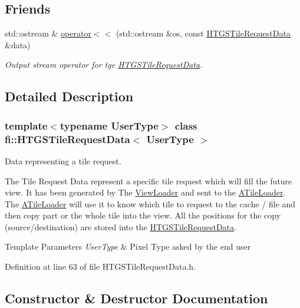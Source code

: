 \subsection*{Friends}
\begin{DoxyCompactItemize}
\item 
std\+::ostream \& \hyperlink{classfi_1_1HTGSTileRequestData_a5fc084a54b46bdd6bf5588119505e047}{operator$<$$<$} (std\+::ostream \&os, const \hyperlink{classfi_1_1HTGSTileRequestData}{H\+T\+G\+S\+Tile\+Request\+Data} \&data)
\begin{DoxyCompactList}\small\item\em Output stream operator for tge \hyperlink{classfi_1_1HTGSTileRequestData}{H\+T\+G\+S\+Tile\+Request\+Data}. \end{DoxyCompactList}\end{DoxyCompactItemize}


\subsection{Detailed Description}
\subsubsection*{template$<$typename User\+Type$>$\newline
class fi\+::\+H\+T\+G\+S\+Tile\+Request\+Data$<$ User\+Type $>$}

Data representing a tile request. 

The Tile Request Data represent a specific tile request which will fill the future view. It has been generated by The \hyperlink{classfi_1_1ViewLoader}{View\+Loader} and sent to the \hyperlink{classfi_1_1ATileLoader}{A\+Tile\+Loader}. The \hyperlink{classfi_1_1ATileLoader}{A\+Tile\+Loader} will use it to know which tile to request to the cache / file and then copy part or the whole tile into the view. All the positions for the copy (source/destination) are stored into the \hyperlink{classfi_1_1HTGSTileRequestData}{H\+T\+G\+S\+Tile\+Request\+Data}. 
\begin{DoxyTemplParams}{Template Parameters}
{\em User\+Type} & Pixel Type asked by the end user \\
\hline
\end{DoxyTemplParams}


Definition at line 63 of file H\+T\+G\+S\+Tile\+Request\+Data.\+h.



\subsection{Constructor \& Destructor Documentation}
\mbox{\label{classfi_1_1HTGSTileRequestData_a65386753d3dabff8532cfd74adab6a40}} 
